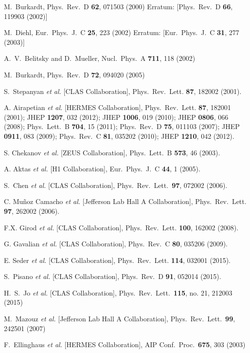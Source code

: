 \documentclass[nofootinbib,twocolumn,showpacs,prl,superscriptaddress,secnumarabic,amssymb,nobibnotes,aps,floatfix]{revtex4}
\begin{document}
\begin{thebibliography}{99}

  M.~Burkardt,
  Phys.\ Rev.\ D {\bf 62}, 071503 (2000)
  Erratum: [Phys.\ Rev.\ D {\bf 66}, 119903 (2002)]

  M.~Diehl,
  Eur.\ Phys.\ J.\ C {\bf 25}, 223 (2002)
  Erratum: [Eur.\ Phys.\ J.\ C {\bf 31}, 277 (2003)]
 
  A.~V.~Belitsky and D.~Mueller,
  Nucl.\ Phys.\ A {\bf 711}, 118 (2002)

  M.~Burkardt,
  Phys.\ Rev.\ D {\bf 72}, 094020 (2005)

S.~Stepanyan {\it et al.} [CLAS Collaboration],
Phys.\ Rev.\ Lett. {\bf 87}, 182002 (2001).

A. Airapetian {\it et al.} [HERMES Collaboration],
Phys.\ Rev.\ Lett. {\bf 87}, 182001 (2001);
JHEP {\bf 1207}, 032 (2012);
JHEP {\bf 1006}, 019 (2010);
JHEP {\bf 0806}, 066 (2008);
Phys.\ Lett.\ B {\bf 704}, 15 (2011);
Phys.\ Rev.\  D {\bf 75}, 011103 (2007);
JHEP {\bf 0911}, 083 (2009);
Phys.\ Rev.\ C {\bf 81}, 035202 (2010);
JHEP {\bf 1210}, 042 (2012).

S. Chekanov {\it et al.} [ZEUS Collaboration],
Phys.\ Lett.\  B {\bf 573}, 46 (2003).

A. Aktas {\it et al.} [H1 Collaboration],
Eur.\ Phys.\ J.\ C {\bf 44}, 1 (2005).

S.~Chen {\it et al.} [CLAS Collaboration],
Phys.\ Rev.\ Lett.\ {\bf 97}, 072002 (2006).

C. Mu\~noz Camacho {\it et al.} [Jefferson Lab Hall A Collaboration],
Phys.\ Rev.\ Lett. {\bf 97}, 262002 (2006).

F.X. Girod {\it et al.} [CLAS Collaboration],
Phys.\ Rev.\ Lett. {\bf 100}, 162002 (2008).

G. Gavalian {\it et al.} [CLAS Collaboration],
Phys.\ Rev.\ C {\bf 80}, 035206 (2009).

E. Seder {\it et al.} [CLAS Collaboration],
Phys.\ Rev.\ Lett. {\bf 114}, 032001 (2015).

S.~Pisano {\it et al.} [CLAS Collaboration],
Phys.\ Rev.\ D {\bf 91}, 052014 (2015).

  H.~S.~Jo {\it et al.} [CLAS Collaboration],
  Phys.\ Rev.\ Lett.\  {\bf 115}, no. 21, 212003 (2015)

  M.~Mazouz {\it et al.} [Jefferson Lab Hall A Collaboration],
   Phys.\ Rev.\ Lett.\  {\bf 99}, 242501 (2007)

  F.~Ellinghaus {\it et al.} [HERMES Collaboration],
  AIP Conf.\ Proc.\  {\bf 675}, 303 (2003)

\end{thebibliography}
\end{document}

